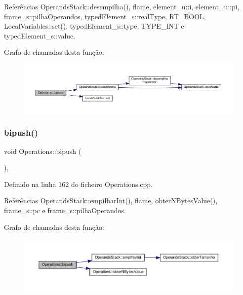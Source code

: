 Referências Operands\+Stack\+::desempilha(), flame, element\+\_\+u\+::i, element\+\_\+u\+::pi, frame\+\_\+s\+::pilha\+Operandos, typed\+Element\+\_\+s\+::real\+Type, R\+T\+\_\+\+B\+O\+OL, Local\+Variables\+::set(), typed\+Element\+\_\+s\+::type, T\+Y\+P\+E\+\_\+\+I\+NT e typed\+Element\+\_\+s\+::value.

Grafo de chamadas desta função\+:
\nopagebreak
\begin{figure}[H]
\begin{center}
\leavevmode
\includegraphics[width=350pt]{classOperations_a6f0ded6d2fc9921a1418387527bec8f4_cgraph}
\end{center}
\end{figure}
\mbox{\label{classOperations_a981b0f43cbe76b4fe7e2122c482d4a5b}} 
\subsubsection{\texorpdfstring{bipush()}{bipush()}}
{\footnotesize\ttfamily void Operations\+::bipush (\begin{DoxyParamCaption}{ }\end{DoxyParamCaption})\hspace{0.3cm}{\ttfamily [static]}, {\ttfamily [private]}}



Definido na linha 162 do ficheiro Operations.\+cpp.



Referências Operands\+Stack\+::empilhar\+Int(), flame, obter\+N\+Bytes\+Value(), frame\+\_\+s\+::pc e frame\+\_\+s\+::pilha\+Operandos.

Grafo de chamadas desta função\+:
\nopagebreak
\begin{figure}[H]
\begin{center}
\leavevmode
\includegraphics[width=350pt]{classOperations_a981b0f43cbe76b4fe7e2122c482d4a5b_cgraph}
\end{center}
\end{figure}
\mbox{\label{classOperations_a4bb55ffc2ba79a76a019a0c02d29d7f9}} 

